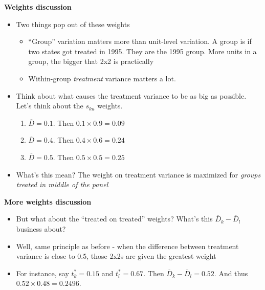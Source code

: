 \documentclass[notes=show]{beamer}
\begin{document}
\begin{frame}[plain]
\begin{center}
\textbf{Weights discussion}
\end{center}

\begin{itemize}
\item Two things pop out of these weights
	\begin{itemize}
	\item ``Group'' variation matters more than unit-level variation.  A group is if two states got treated in 1995.  They are the 1995 group. More units in a group, the bigger that 2x2 is practically
	\item Within-group \emph{treatment} variance matters a lot. 
	\end{itemize}
\item Think about what causes the treatment variance to be as big as possible. Let's think about the $s_{ku}$ weights.
	\begin{enumerate}
	\item $\overline{D}=0.1$. Then $0.1 \times 0.9 = 0.09$
	\item $\overline{D}=0.4$. Then $0.4 \times 0.6 =0.24$
	\item $\overline{D}=0.5$. Then $0.5 \times 0.5 = 0.25$
	\end{enumerate}
\item What's this mean? The weight on treatment variance is maximized for \emph{groups treated in middle of the panel}
\end{itemize}
\end{frame}

\begin{frame}[plain]
\begin{center}
\textbf{More weights discussion}
\end{center}

\begin{itemize}
\item But what about the ``treated on treated'' weights?  What's this $\overline{D}_k - \overline{D}_{l} $ business about?  
\item Well, same principle as before - when the difference between treatment variance is close to 0.5, those 2x2s are given the greatest weight
\item For instance, say $t^*_k=0.15$ and $t^*_l=0.67$. Then $\overline{D}_k - \overline{D}_{l} = 0.52$.  And thus $0.52 \times 0.48 = 0.2496$.
\end{itemize}

\end{frame}
\end{document}
